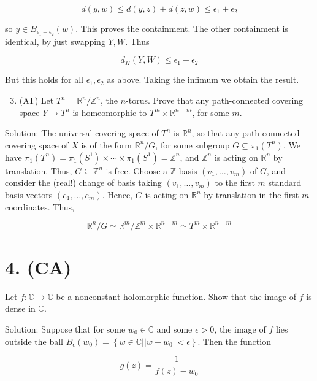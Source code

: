 \documentclass[10pt]{article}
\begin{document}
$$
d(y, w) \leq d(y, z)+d(z, w) \leq \epsilon_{1}+\epsilon_{2}
$$

so $y \in B_{\epsilon_{1}+\epsilon_{2}}(w)$. This proves the containment. The other containment is identical, by just swapping $Y, W$. Thus

$$
d_{H}(Y, W) \leq \epsilon_{1}+\epsilon_{2}
$$

But this holds for all $\epsilon_{1}, \epsilon_{2}$ as above. Taking the infimum we obtain the result.

\begin{enumerate}
  \setcounter{enumi}{2}
  \item (AT) Let $T^{n}=\mathbb{R}^{n} / \mathbb{Z}^{n}$, the $n$-torus. Prove that any path-connected covering space $Y \rightarrow T^{n}$ is homeomorphic to $T^{m} \times \mathbb{R}^{n-m}$, for some $m$.
\end{enumerate}

Solution: The universal covering space of $T^{n}$ is $\mathbb{R}^{n}$, so that any path connected covering space of $X$ is of the form $\mathbb{R}^{n} / G$, for some subgroup $G \subseteq \pi_{1}\left(T^{n}\right)$. We have $\pi_{1}\left(T^{n}\right)=\pi_{1}\left(S^{1}\right) \times \cdots \times \pi_{1}\left(S^{1}\right)=\mathbb{Z}^{n}$, and $\mathbb{Z}^{n}$ is acting on $\mathbb{R}^{n}$ by translation. Thus, $G \subseteq \mathbb{Z}^{n}$ is free. Choose a $\mathbb{Z}$-basis $\left(v_{1}, \ldots, v_{m}\right)$ of $G$, and consider the (real!) change of basis taking $\left(v_{1}, \ldots, v_{m}\right)$ to the first $m$ standard basis vectors $\left(e_{1}, \ldots, e_{m}\right)$. Hence, $G$ is acting on $\mathbb{R}^{n}$ by translation in the first $m$ coordinates. Thus,

$$
\mathbb{R}^{n} / G \simeq \mathbb{R}^{m} / \mathbb{Z}^{m} \times \mathbb{R}^{n-m} \simeq T^{m} \times \mathbb{R}^{n-m}
$$

\section{4. (CA)}
Let $f: \mathbb{C} \rightarrow \mathbb{C}$ be a nonconstant holomorphic function. Show that the image of $f$ is dense in $\mathbb{C}$.

Solution: Suppose that for some $w_{0} \in \mathbb{C}$ and some $\epsilon>0$, the image of $f$ lies outside the ball $B_{\epsilon}\left(w_{0}\right)=\left\{w \in \mathbb{C}|| w-w_{0} \mid<\epsilon\right\}$. Then the function

$$
g(z)=\frac{1}{f(z)-w_{0}}
$$
\end{document}
